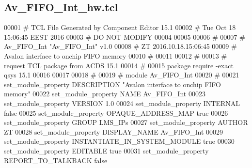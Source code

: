 \subsection{Av\+\_\+\+F\+I\+F\+O\+\_\+\+Int\+\_\+hw.\+tcl}
\label{Av__FIFO__Int__hw_8tcl_source}

\begin{DoxyCode}
00001 \textcolor{comment}{# TCL File Generated by Component Editor 15.1}
00002 \textcolor{comment}{}\textcolor{comment}{# Tue Oct 18 15:06:45 EEST 2016}
00003 \textcolor{comment}{}\textcolor{comment}{# DO NOT MODIFY}
00004 \textcolor{comment}{}
00005 
00006 \textcolor{comment}{# }
00007 \textcolor{comment}{}\textcolor{comment}{# Av\_FIFO\_Int "Av\_FIFO\_Int" v1.0}
00008 \textcolor{comment}{}\textcolor{comment}{# ZT 2016.10.18.15:06:45}
00009 \textcolor{comment}{}\textcolor{comment}{# Avalon interface to onchip FIFO memory}
00010 \textcolor{comment}{}\textcolor{comment}{# }
00011 \textcolor{comment}{}
00012 \textcolor{comment}{# }
00013 \textcolor{comment}{}\textcolor{comment}{# request TCL package from ACDS 15.1}
00014 \textcolor{comment}{}\textcolor{comment}{# }
00015 \textcolor{comment}{}\textcolor{keyword}{package} require -exact qsys 15.1\textcolor{comment}{}
00016 \textcolor{comment}{}
00017 
00018 \textcolor{comment}{# }
00019 \textcolor{comment}{}\textcolor{comment}{# module Av\_FIFO\_Int}
00020 \textcolor{comment}{}\textcolor{comment}{# }
00021 \textcolor{comment}{}set\_module\_property DESCRIPTION "Avalon interface to onchip FIFO memory"\textcolor{comment}{}
00022 \textcolor{comment}{}set\_module\_property NAME Av\_FIFO\_Int\textcolor{comment}{}
00023 \textcolor{comment}{}set\_module\_property VERSION 1.0\textcolor{comment}{}
00024 \textcolor{comment}{}set\_module\_property INTERNAL false\textcolor{comment}{}
00025 \textcolor{comment}{}set\_module\_property OPAQUE\_ADDRESS\_MAP true\textcolor{comment}{}
00026 \textcolor{comment}{}set\_module\_property GROUP LMS\_IPs\textcolor{comment}{}
00027 \textcolor{comment}{}set\_module\_property AUTHOR ZT\textcolor{comment}{}
00028 \textcolor{comment}{}set\_module\_property DISPLAY\_NAME Av\_FIFO\_Int\textcolor{comment}{}
00029 \textcolor{comment}{}set\_module\_property INSTANTIATE\_IN\_SYSTEM\_MODULE true\textcolor{comment}{}
00030 \textcolor{comment}{}set\_module\_property EDITABLE true\textcolor{comment}{}
00031 \textcolor{comment}{}set\_module\_property REPORT\_TO\_TALKBACK false\textcolor{comment}{}

\end{DoxyCode}

